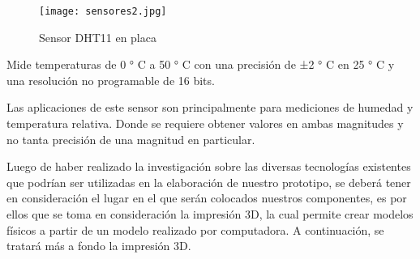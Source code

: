 \begin{itemize}
	\begin{figure}[H]
		\centering
		\texttt{[image: sensores2.jpg]}
		\caption{Sensor DHT11 en placa}
	\end{figure}
	
	\par \noindent
	Mide temperaturas de 0 ° C a 50 ° C con una precisión de ±2 ° C en 25 ° C y una resolución no programable de 16 bits.
	
	\par \noindent
	Las aplicaciones de este sensor son principalmente para mediciones de humedad y temperatura relativa. Donde se requiere obtener valores en ambas magnitudes y no tanta precisión de una magnitud en particular\cite{dht11}. 
	
\end{itemize}

\par \noindent
Luego de haber realizado la investigación sobre las diversas tecnologías existentes que podrían ser utilizadas en la elaboración de nuestro prototipo, se deberá tener en consideración el lugar en el que serán colocados nuestros componentes, es por ellos que se toma en consideración la impresión 3D, la cual permite crear modelos físicos a partir de un modelo realizado por computadora. A continuación, se tratará más a fondo la impresión 3D.

